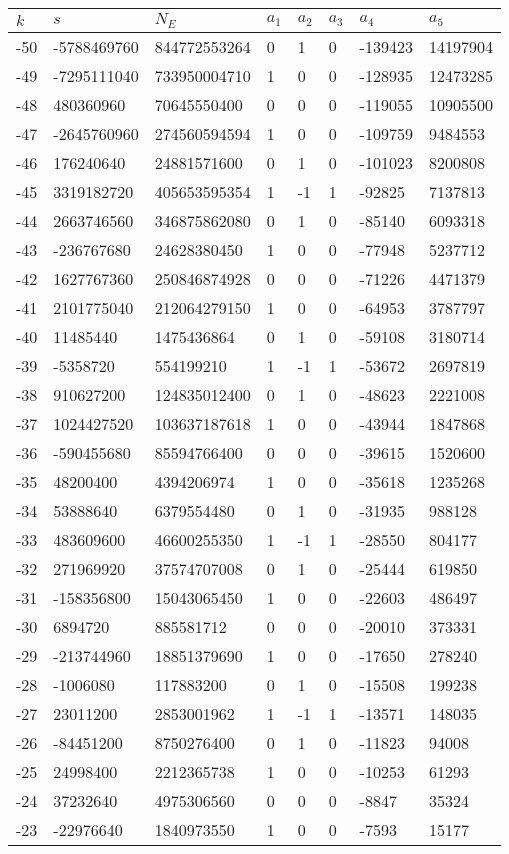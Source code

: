 \documentclass{amsart}
\begin{document}
\begin{longtable}{|l|l|l|lllll|}
\hline
$k$ & $s$ & $N_E$ & $a_1$ & $a_2$ & $a_3$ & $a_4$ & $a_5$\\
\hline
-50&-5788469760&844772553264&0&1&0&-139423&14197904\\
-49&-7295111040&733950004710&1&0&0&-128935&12473285\\
-48&480360960&70645550400&0&0&0&-119055&10905500\\
-47&-2645760960&274560594594&1&0&0&-109759&9484553\\
-46&176240640&24881571600&0&1&0&-101023&8200808\\
-45&3319182720&405653595354&1&-1&1&-92825&7137813\\
-44&2663746560&346875862080&0&1&0&-85140&6093318\\
-43&-236767680&24628380450&1&0&0&-77948&5237712\\
-42&1627767360&250846874928&0&0&0&-71226&4471379\\
-41&2101775040&212064279150&1&0&0&-64953&3787797\\
-40&11485440&1475436864&0&1&0&-59108&3180714\\
-39&-5358720&554199210&1&-1&1&-53672&2697819\\
-38&910627200&124835012400&0&1&0&-48623&2221008\\
-37&1024427520&103637187618&1&0&0&-43944&1847868\\
-36&-590455680&85594766400&0&0&0&-39615&1520600\\
-35&48200400&4394206974&1&0&0&-35618&1235268\\
-34&53888640&6379554480&0&1&0&-31935&988128\\
-33&483609600&46600255350&1&-1&1&-28550&804177\\
-32&271969920&37574707008&0&1&0&-25444&619850\\
-31&-158356800&15043065450&1&0&0&-22603&486497\\
-30&6894720&885581712&0&0&0&-20010&373331\\
-29&-213744960&18851379690&1&0&0&-17650&278240\\
-28&-1006080&117883200&0&1&0&-15508&199238\\
-27&23011200&2853001962&1&-1&1&-13571&148035\\
-26&-84451200&8750276400&0&1&0&-11823&94008\\
-25&24998400&2212365738&1&0&0&-10253&61293\\
-24&37232640&4975306560&0&0&0&-8847&35324\\
-23&-22976640&1840973550&1&0&0&-7593&15177\\

\end{longtable}
\end{document}
